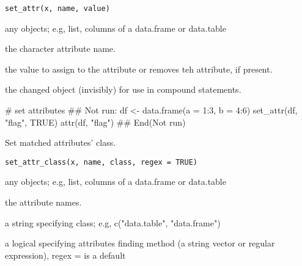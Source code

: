 \documentclass[letterpaper]{book}
\begin{document}
%
\begin{Usage}
\begin{verbatim}
set_attr(x, name, value)
\end{verbatim}
\end{Usage}
%
\begin{Arguments}
\begin{ldescription}
\item[\code{x}] any objects; e.g, list, columns of a data.frame or data.table

\item[\code{name}] the character attribute name.

\item[\code{value}] the value to assign to the attribute or  removes teh attribute, if present.
\end{ldescription}
\end{Arguments}
%
\begin{Value}
the changed object (invisibly) for use in compound statements.
\end{Value}
%
\begin{Examples}
\begin{ExampleCode}
# set attributes
## Not run: df <- data.frame(a = 1:3, b = 4:6)
set_attr(df, "flag", TRUE)
attr(df, "flag")
## End(Not run)

\end{ExampleCode}
\end{Examples}
%
\begin{Description}
Set matched attributes' class.
\end{Description}
%
\begin{Usage}
\begin{verbatim}
set_attr_class(x, name, class, regex = TRUE)
\end{verbatim}
\end{Usage}
%
\begin{Arguments}
\begin{ldescription}
\item[\code{x}] any objects; e.g, list, columns of a data.frame or data.table

\item[\code{name}] the attribute names.

\item[\code{class}] a string specifying class; e.g, c("data.table", "data.frame")

\item[\code{regex}] a logical specifying attributes finding method (a string vector or regular expression),
regex =  is a default
\end{ldescription}
\end{Arguments}
\end{document}

